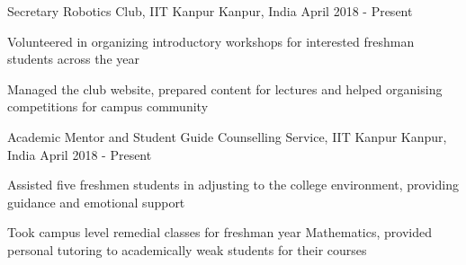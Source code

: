 \begin{cventries}

  \cventry
    {Secretary}
    {Robotics Club, IIT Kanpur}
    {Kanpur, India} 
    {April 2018 - Present} 
    {
      \begin{cvitems}
        \item {Volunteered in organizing introductory workshops for interested freshman students across the year}
        \item{Managed the club website, prepared content for lectures and helped organising competitions for campus community}
        \end{cvitems}
    }

  \cventry
    {Academic Mentor and Student Guide}
    {Counselling Service, IIT Kanpur}
    {Kanpur, India}
    {April 2018 - Present}
    {
      \begin{cvitems} %
        \item {Assisted five freshmen students in adjusting to the college environment, providing guidance and emotional support}
        \item{Took campus level remedial classes for freshman year Mathematics, provided personal tutoring to academically weak students for their courses}
      \end{cvitems}
    }

\end{cventries}
